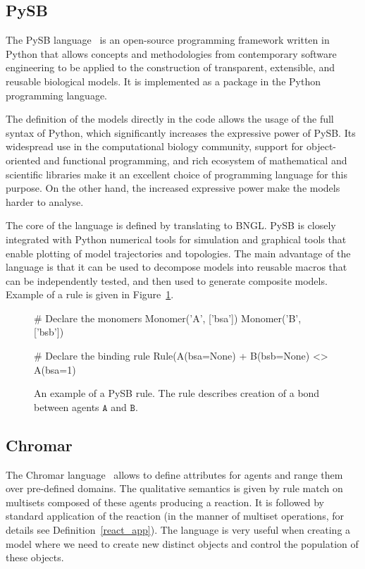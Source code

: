 \documentclass[11pt,a4paper]{report}
\begin{document}
\subsection{PySB}

The PySB language~\cite{lopez2013programming} is an open-source programming framework written in Python that allows concepts and methodologies from contemporary software engineering to be applied to the construction of transparent, extensible, and reusable biological models. It is implemented as a package in the Python programming language. 

The definition of the models directly in the code allows the usage of the full syntax of Python, which significantly increases the expressive power of PySB. Its widespread use in the computational biology community, support for object-oriented and functional programming, and rich ecosystem of mathematical and scientific libraries make it an excellent choice of programming language for this purpose. On the other hand, the increased expressive power make the models harder to analyse.

The core of the language is defined by translating to BNGL. PySB is closely integrated with Python numerical tools for simulation and graphical tools that enable plotting of model trajectories and topologies. The main advantage of the language is that it can be used to decompose models into reusable macros that can be independently tested, and then used to generate composite models. Example of a rule is given in Figure~\ref{pysb_rule}.

\begin{figure}[!h]
\begin{center}
\begin{python}
# Declare the monomers
Monomer('A', ['bsa'])
Monomer('B', ['bsb'])

# Declare the binding rule
Rule(A(bsa=None) +  B(bsb=None) <> A(bsa=1) %
\end{python}
\end{center}
\caption{An example of a PySB rule. The rule describes creation of a bond between agents $\mathtt{A}$ and $\mathtt{B}$.}\label{PySB-rule}\label{pysb_rule}
\end{figure}

\subsection{Chromar}

The Chromar language~\cite{honorato2018chromar} allows to define attributes for agents and range them over pre-defined domains. The qualitative semantics is given by rule match on multisets composed of these agents producing a reaction. It is followed by standard application of the reaction (in the manner of multiset operations, for details see Definition~\ref{react_app}). The language is very useful when creating a model where we need to create new distinct objects and control the population of these objects.
\end{document}
